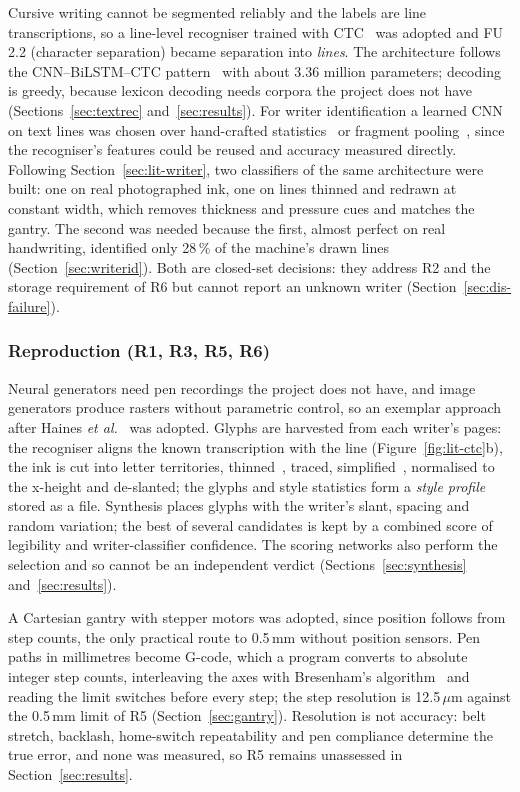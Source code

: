 Cursive writing cannot be segmented reliably and the labels are line transcriptions, so a line-level recogniser trained with CTC~\cite{graves2006} was adopted and FU\,2.2 (character separation) became separation into \emph{lines}.
The architecture follows the CNN--BiLSTM--CTC pattern~\cite{shi2017,puigcerver2017,kizilirmak2023} with about 3.36 million parameters; decoding is greedy, because lexicon decoding needs corpora the project does not have (Sections~\ref{sec:textrec} and~\ref{sec:results}).
For writer identification a learned CNN on text lines was chosen over hand-crafted statistics~\cite{bulacu2007} or fragment pooling~\cite{he2020}, since the recogniser's features could be reused and accuracy measured directly.
Following Section~\ref{sec:lit-writer}, two classifiers of the same architecture were built: one on real photographed ink, one on lines thinned and redrawn at constant width, which removes thickness and pressure cues and matches the gantry.
The second was needed because the first, almost perfect on real handwriting, identified only 28\,\% of the machine's drawn lines (Section~\ref{sec:writerid}).
Both are closed-set decisions: they address R2 and the storage requirement of R6 but cannot report an unknown writer (Section~\ref{sec:dis-failure}).

\subsubsection{Reproduction (R1, R3, R5, R6)}

Neural generators need pen recordings the project does not have, and image generators produce rasters without parametric control, so an exemplar approach after Haines \emph{et al.}~\cite{haines2016} was adopted.
Glyphs are harvested from each writer's pages: the recogniser aligns the known transcription with the line (Figure~\ref{fig:lit-ctc}b), the ink is cut into letter territories, thinned~\cite{zhang1984}, traced, simplified~\cite{douglas1973}, normalised to the x-height and de-slanted; the glyphs and style statistics form a \emph{style profile} stored as a file.
Synthesis places glyphs with the writer's slant, spacing and random variation; the best of several candidates is kept by a combined score of legibility and writer-classifier confidence.
The scoring networks also perform the selection and so cannot be an independent verdict (Sections~\ref{sec:synthesis} and~\ref{sec:results}).

A Cartesian gantry with stepper motors was adopted, since position follows from step counts, the only practical route to 0.5\,mm without position sensors.
Pen paths in millimetres become G-code, which a program converts to absolute integer step counts, interleaving the axes with Bresenham's algorithm~\cite{bresenham1965} and reading the limit switches before every step; the step resolution is 12.5\,$\mu$m against the 0.5\,mm limit of R5 (Section~\ref{sec:gantry}).
Resolution is not accuracy: belt stretch, backlash, home-switch repeatability and pen compliance determine the true error, and none was measured, so R5 remains unassessed in Section~\ref{sec:results}.


